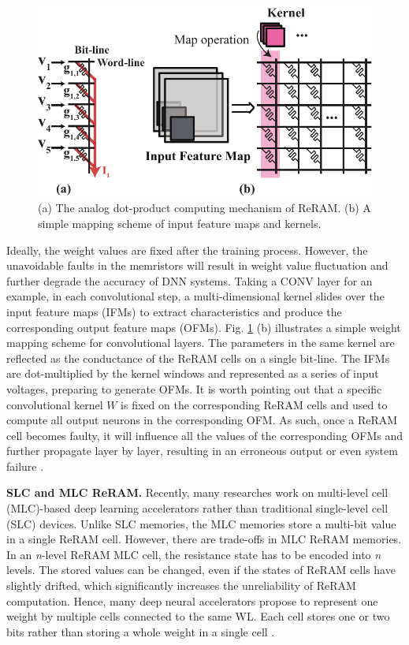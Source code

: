 \begin{figure}
    \centering
    \includegraphics[width=0.9\linewidth]{images/OL-fig1}
    \caption{(a) The analog dot-product computing mechanism of ReRAM. (b) A simple mapping scheme of input feature maps and kernels.}
    \label{fig:reramcomputing}
    \vspace {-10pt}
\end{figure}

Ideally, the weight values are fixed after the training process. However, the unavoidable faults in the memristors will result in weight value fluctuation and further degrade the accuracy of DNN systems. Taking a CONV layer for an example, in each convolutional step, a multi-dimensional kernel slides over the input feature maps (IFMs)  to extract characteristics and produce the corresponding output feature maps (OFMs).  Fig. \ref{fig:reramcomputing} (b) illustrates a simple weight mapping scheme for convolutional layers. The parameters in the same kernel are reflected as the conductance of the ReRAM cells on a single bit-line. The IFMs are dot-multiplied by the kernel windows and represented as a series of input voltages, preparing to generate OFMs. It is worth pointing out that a specific convolutional kernel ${W}$ is fixed on the corresponding ReRAM cells and used to compute all output neurons in the corresponding OFM. As such, once a ReRAM cell becomes faulty, it will influence all the values of the corresponding OFMs and further propagate layer by layer, resulting in an erroneous output or even system failure \cite{Li:2017:UEP:3126908.3126964, xu2020hybrid, xu2021reliability}. 

{\bf SLC and MLC ReRAM.} Recently, many researches work on multi-level cell (MLC)-based deep learning accelerators rather than traditional single-level cell (SLC) devices. Unlike SLC memories, the MLC memories store a multi-bit value in a single ReRAM cell. However, there are trade-offs in MLC ReRAM memories. In an \emph{n}-level ReRAM MLC cell, the resistance state has to be encoded into \emph{n} levels. The stored values can be changed, even if the states of ReRAM cells have slightly drifted, which significantly increases the unreliability of ReRAM computation. Hence, many deep neural accelerators propose to represent one weight by multiple cells connected to the same WL. Each cell stores one or two bits rather than storing a whole weight in a single cell \cite{8715178}.  

